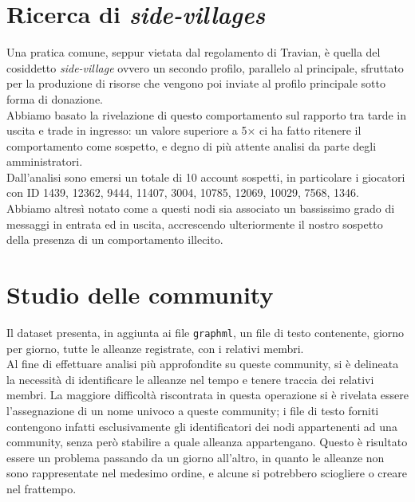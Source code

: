 \section{Ricerca di \textit{side-villages}}
Una pratica comune, seppur vietata dal regolamento di Travian, è quella del cosiddetto \textit{side-village} ovvero un secondo profilo, parallelo al principale, sfruttato per la produzione di risorse che vengono poi inviate al profilo principale sotto forma di donazione.\\
Abbiamo basato la rivelazione di questo comportamento sul rapporto tra tarde in uscita e trade in ingresso: un valore superiore a 5$\times$ ci ha fatto ritenere il comportamento come sospetto, e degno di più attente analisi da parte degli amministratori.\\
Dall'analisi sono emersi un totale di 10 account sospetti, in particolare i giocatori con ID 1439, 12362, 9444, 11407, 3004, 10785, 12069, 10029, 7568, 1346.\\
Abbiamo altresì notato come a questi nodi sia associato un bassissimo grado di messaggi in entrata ed in uscita, accrescendo ulteriormente il nostro sospetto della presenza di un comportamento illecito.

\section{Studio delle community}
Il dataset presenta, in aggiunta ai file \texttt{graphml}, un file di testo contenente, giorno per giorno, tutte le alleanze registrate, con i relativi membri.\\
Al fine di effettuare analisi più approfondite su queste community, si è delineata la necessità di identificare le alleanze nel tempo e tenere traccia dei relativi membri.
La maggiore difficoltà riscontrata in questa operazione si è rivelata essere l'assegnazione di un nome univoco a queste community; i file di testo forniti contengono infatti esclusivamente gli identificatori dei nodi appartenenti ad una community, senza però stabilire a quale alleanza appartengano.
Questo è risultato essere un problema passando da un giorno all'altro, in quanto le alleanze non sono rappresentate nel medesimo ordine, e alcune si potrebbero sciogliere o creare nel frattempo.

